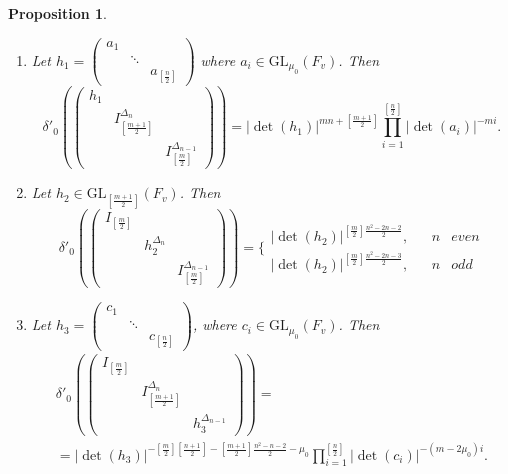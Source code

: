 \documentclass[12pts]{amsart}
\newcommand{\GL}{{\mathrm{GL}}}
\newtheorem{prop}[thm]{Proposition}
\begin{document}
 \begin{prop}\label{prop 13.8}
 	\begin{enumerate}
 	\item Let $h_1=\begin{pmatrix}a_1\\&\ddots\\&&a_{[\frac{n}{2}]}\end{pmatrix}$ where
 	$a_i\in \GL_{\mu_0}(F_v)$. Then
 		\begin{equation}\label{13.33}
 		\delta'_0(\begin{pmatrix}h_1\\&I_{[\frac{m+1}{2}]}^{\Delta_n}\\&&I_{[\frac{m}{2}]}^{\Delta_{n-1}}\end{pmatrix})=|\det(h_1)|^{mn+[\frac{m+1}{2}]}\prod_{i=1}^{[\frac{n}{2}]}|\det(a_i)|^{-mi}.
 		\end{equation}
 	\item Let $h_2\in \GL_{[\frac{m+1}{2}]}(F_v)$. Then
 	\begin{equation}\label{13.34}
 	\delta'_0(\begin{pmatrix}I_{[\frac{m}{2}]}\\&h_2^{\Delta_n}\\&&I_{[\frac{m}{2}]}^{\Delta_{n-1}}\end{pmatrix})=\{\begin{matrix}|\det(h_2)|^{[\frac{m}{2}]\frac{n^2-2n-2}{2}},&& n&\textit{even}\\
 	|\det(h_2)|^{[\frac{m}{2}]\frac{n^2-2n-3}{2}},&&n&\textit{odd}\end{matrix}
 	\end{equation}
 	\item Let $h_3=\begin{pmatrix}c_1\\&\ddots\\&&c_{[\frac{n}{2}]}\end{pmatrix}$, where
 	$c_i\in \GL_{\mu_0}(F_v)$. Then
 	\begin{multline}\label{13.35}
 	\delta'_0(\begin{pmatrix}I_{[\frac{m}{2}]}\\&I_{[\frac{m+1}{2}]}^{\Delta_n}\\&&h_3^{\Delta_{n-1}}\end{pmatrix})=\\
 	=|\det(h_3)|^{-[\frac{m}{2}][\frac{n+1}{2}]-[\frac{m+1}{2}]\frac{n^2-n-2}{2}-\mu_0}\prod_{i=1}^{[\frac{n}{2}]}|\det(c_i)|^{-(m-2\mu_0)i}.
 	\end{multline} 		
 	\end{enumerate}
 \end{prop}
\end{document}
